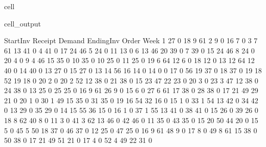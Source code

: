 \documentclass[letterpaper,10pt,english]{jupyterBook}
\begin{document}
\begin{sphinxuseclass}{cell}
\begin{sphinxVerbatimOutput}
\begin{sphinxuseclass}{cell_output}
\begin{sphinxVerbatim}[commandchars=\\\{\}]
     Start\PYGZus{}Inv Receipt  Demand Ending\PYGZus{}Inv Order
Week                                           
1           27       0      18          9    61
2            9       0      16         \PYGZhy{}7     0
3           \PYGZhy{}7      61      13         41     0
4           41       0      17         24    46
5           24       0      11         13     0
6           13      46      20         39     0
7           39       0      15         24    46
8           24       0      20          4     0
9            4      46      15         35     0
10          35       0      10         25     0
11          25       0      19          6    64
12           6       0      18        \PYGZhy{}12     0
13         \PYGZhy{}12      64      12         40     0
14          40       0      13         27     0
15          27       0      13         14    56
16          14       0      14          0     0
17           0      56      19         37     0
18          37       0      19         18    52
19          18       0      20         \PYGZhy{}2     0
20          \PYGZhy{}2      52      12         38     0
21          38       0      15         23    47
22          23       0      20          3     0
23           3      47      12         38     0
24          38       0      13         25     0
25          25       0      16          9    61
26           9       0      15         \PYGZhy{}6     0
27          \PYGZhy{}6      61      17         38     0
28          38       0      17         21    49
29          21       0      20          1     0
30           1      49      15         35     0
31          35       0      19         16    54
32          16       0      15          1     0
33           1      54      13         42     0
34          42       0      13         29     0
35          29       0      14         15    55
36          15       0      16         \PYGZhy{}1     0
37          \PYGZhy{}1      55      13         41     0
38          41       0      15         26     0
39          26       0      18          8    62
40           8       0      11         \PYGZhy{}3     0
41          \PYGZhy{}3      62      13         46     0
42          46       0      11         35     0
43          35       0      15         20    50
44          20       0      15          5     0
45           5      50      18         37     0
46          37       0      12         25     0
47          25       0      16          9    61
48           9       0      17         \PYGZhy{}8     0
49          \PYGZhy{}8      61      15         38     0
50          38       0      17         21    49
51          21       0      17          4     0
52           4      49      22         31     0
\end{sphinxVerbatim}

\end{sphinxuseclass}\end{sphinxVerbatimOutput}

\end{sphinxuseclass}
\end{document}

